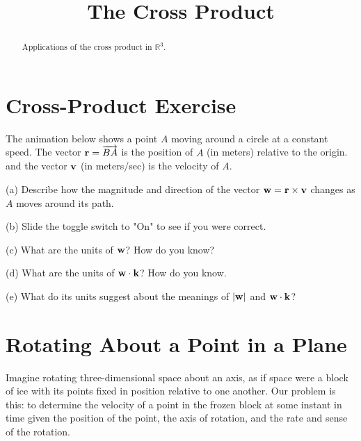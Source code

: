 \documentclass{ximera}
\title{The Cross Product}
\begin{document}
\begin{abstract}
Applications of the cross product in $\mathbb{R}^3$.
\end{abstract}
\maketitle


\section{Cross-Product Exercise}
The animation below shows a point $A$ moving around a circle at a constant speed. The vector ${\bf r} = \overrightarrow{BA}$ is the position of $A$ (in meters) relative to the origin. and the vector ${\bf v}$ (in meters/sec) is the velocity of $A$. 

(a) Describe how the magnitude and direction of the vector ${\bf w} = {\bf r}\times {\bf v}$ changes as $A$ moves around its path.

(b) Slide the toggle switch to "On" to see if you were correct.

(c) What are the units of ${\bf w}$? How do you know?

(d) What are the units of ${\bf w} \cdot {\bf k}$? How do you know.

(e) What do its units suggest about the meanings of $|{\bf w}|$ and ${\bf w} \cdot {\bf k}$?


\begin{exploration}   \label{Exsd67g:Cross}
 
\begin{onlineOnly}
    \begin{center}
\end{center}
\end{onlineOnly}

\end{exploration}

\section{Rotating About a Point in a Plane}

Imagine rotating three-dimensional space about an axis, as if space were a block of ice with its points fixed in position relative to one another. Our problem is this: to determine the velocity of a point in the frozen block at some instant in time given the position of the point, the axis of rotation, and the rate and sense of the rotation.
\end{document}
